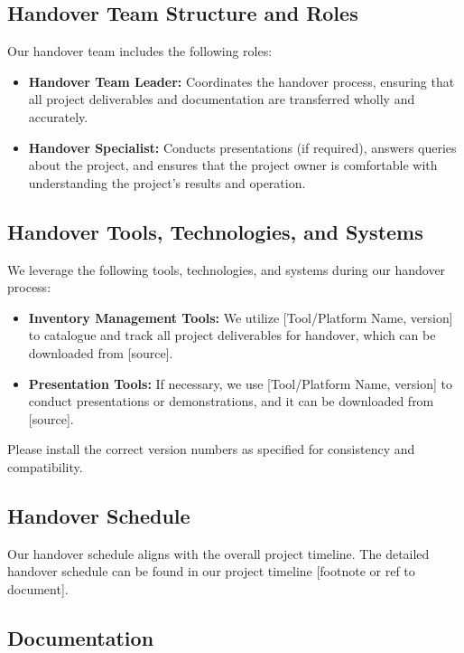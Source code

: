 \documentclass[10pt]{projectdoc}
\begin{document}
\subsection{Handover Team Structure and Roles}

Our handover team includes the following roles:

\begin{itemize}
\item \textbf{Handover Team Leader:} Coordinates the handover process, ensuring that all project deliverables and documentation are transferred wholly and accurately.
\item \textbf{Handover Specialist:} Conducts presentations (if required), answers queries about the project, and ensures that the project owner is comfortable with understanding the project's results and operation.
\end{itemize}

\subsection{Handover Tools, Technologies, and Systems}

We leverage the following tools, technologies, and systems during our handover process:

\begin{itemize}
\item \textbf{Inventory Management Tools:} We utilize [Tool/Platform Name, version] to catalogue and track all project deliverables for handover, which can be downloaded from [source].
\item \textbf{Presentation Tools:} If necessary, we use [Tool/Platform Name, version] to conduct presentations or demonstrations, and it can be downloaded from [source].
\end{itemize}

Please install the correct version numbers as specified for consistency and compatibility.

\subsection{Handover Schedule}

Our handover schedule aligns with the overall project timeline. The detailed handover schedule can be found in our project timeline [footnote or ref to document].

\subsection{Documentation}
\end{document}
